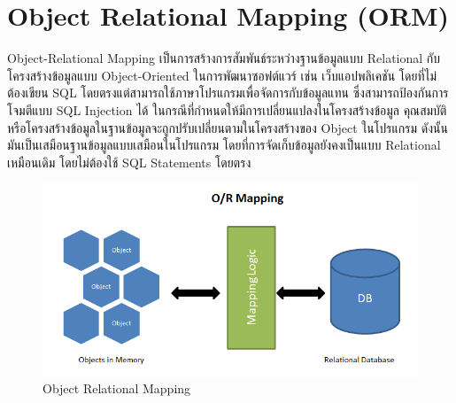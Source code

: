 \section{Object Relational Mapping (ORM)}
Object-Relational Mapping \cite{orm} เป็นการสร้างการสัมพันธ์ระหว่างฐานข้อมูลแบบ Relational กับโครงสร้างข้อมูลแบบ Object-Oriented 
ในการพัฒนาซอฟต์แวร์ เช่น เว็บแอปพลิเคชัน โดยที่ไม่ต้องเขียน SQL โดยตรงแต่สามารถใช้ภาษาโปรแกรมเพื่อจัดการกับข้อมูลแทน 
ซึ่งสามารถป้องกันการโจมตีแบบ SQL Injection ได้ ในกรณีที่กำหนดให้มีการเปลี่ยนแปลงในโครงสร้างข้อมูล 
คุณสมบัติหรือโครงสร้างข้อมูลในฐานข้อมูลจะถูกปรับเปลี่ยนตามในโครงสร้างของ Object ในโปรแกรม ดังนั้นมันเป็นเสมือนฐานข้อมูลแบบเสมือนในโปรแกรม 
โดยที่การจัดเก็บข้อมูลยังคงเป็นแบบ Relational เหมือนเดิม โดยไม่ต้องใช้ SQL Statements โดยตรง
\begin{figure}[h]
  \begin{center}
  \includegraphics[scale=0.3]{resources/ORM.png}
  \end{center}
  \caption[Object Relational Mapping]{Object Relational Mapping}
  \label{fig:orm}
\end{figure}

